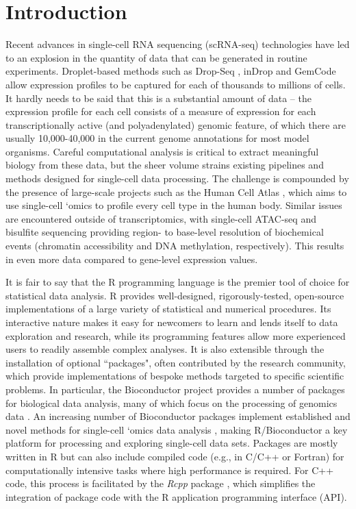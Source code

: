 \documentclass[10pt,letterpaper]{article}
\begin{document}
\linenumbers

\section*{Introduction}
Recent advances in single-cell RNA sequencing (scRNA-seq) technologies have led to an explosion in the quantity of data that can be generated in routine experiments.
Droplet-based methods such as Drop-Seq \cite{macosko2015highly}, inDrop \cite{klein2015droplet} and GemCode \cite{zheng2017massively} allow expression profiles to be captured for each of thousands to millions of cells.
It hardly needs to be said that this is a substantial amount of data -- the expression profile for each cell consists of a measure of expression for each transcriptionally active (and polyadenylated) genomic feature, of which there are usually 10,000-40,000 in the current genome annotations for most model organisms.
Careful computational analysis is critical to extract meaningful biology from these data, but the sheer volume strains existing pipelines and methods designed for single-cell data processing.
The challenge is compounded by the presence of large-scale projects such as the Human Cell Atlas \cite{regev2017human}, which aims to use single-cell `omics to profile every cell type in the human body.
Similar issues are encountered outside of transcriptomics, with single-cell ATAC-seq \cite{buenrostro2015single} and bisulfite sequencing \cite{smallwood2014single} providing region- to base-level resolution of biochemical events (chromatin accessibility and DNA methylation, respectively).
This results in even more data compared to gene-level expression values.

It is fair to say that the R programming language \cite{R} is the premier tool of choice for statistical data analysis.
R provides well-designed, rigorously-tested, open-source implementations of a large variety of statistical and numerical procedures.
Its interactive nature makes it easy for newcomers to learn and lends itself to data exploration and research, while its programming features allow more experienced users to readily assemble complex analyses.
It is also extensible through the installation of optional ``packages", often contributed by the research community, which provide implementations of bespoke methods targeted to specific scientific problems.
In particular, the Bioconductor project \cite{gentleman2004bioconductor} provides a number of packages for biological data analysis, many of which focus on the processing of genomics data \cite{huber2015orchestrating}.
An increasing number of Bioconductor packages implement established and novel methods for single-cell `omics data analysis \cite{trapnell2014dynamics,lun2016pooling,mccarthy2017scater,finak2015mast}, making R/Bioconductor a key platform for processing and exploring single-cell data sets.
Packages are mostly written in R but can also include compiled code (e.g., in C/C++ or Fortran) for computationally intensive tasks where high performance is required.
For C++ code, this process is facilitated by the \textit{Rcpp} package \cite{eddelbuettel2011seamless}, which simplifies the integration of package code with the R application programming interface (API).
\end{document}
